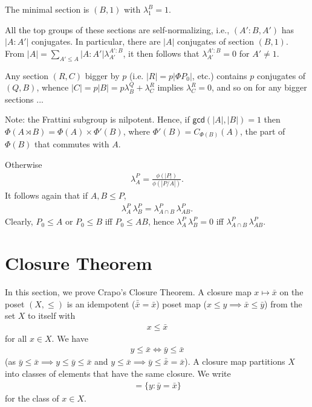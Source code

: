 \documentclass[12pt,a4paper]{amsart}
\newcommand{\Size}[1]{\left|#1\right|}
\renewcommand{\gcd}{\mathsf{gcd}}
\begin{document}
The minimal section is $(B, 1)$
with $\lambda^B_1 = 1$.

All the top groups of these sections are self-normalizing,
i.e., $(A':B, A')$ has $\Size{A:A'}$ conjugates.
In particular, there are $\Size{A}$ conjugates of section $(B, 1)$.
From $\Size{A} = \sum_{A' \leq A} \Size{A:A'} \lambda^{A':B}_{A'}$,
it then follows that $\lambda^{A':B}_{A'} = 0$ for $A' \neq 1$.

Any section $(R, C)$ bigger by $p$ (i.e. $\Size{R} = p \Size{\Phi{P_0}}$, etc.)
contains $p$ conjugates of $(Q, B)$,
whence
$\Size{C} = p \Size{B} = p \lambda^Q_B + \lambda^R_C$
implies $\lambda^R_C = 0$, and so on for any bigger sections ...

Note: the Frattini subgroup is nilpotent. Hence, if $\gcd(\Size{A}, \Size{B}) = 1$ then
$\Phi(A \rtimes B) = \Phi(A) \times \Phi'(B)$,
where $\Phi'(B) = C_{\Phi(B)}(A)$, the part of $\Phi(B)$ that
commutes with $A$.


Otherwise
\begin{align*}
  \lambda^P_A = \frac{\phi(\Size{P})}{\phi(\Size{P/A})}.
\end{align*}
It follows again that
if $A, B \leq P$,
\begin{align*}
  \lambda^P_A\, \lambda^P_B = \lambda^P_{A \cap B}\, \lambda^P_{AB}.
\end{align*}
Clearly, $P_0 \leq A$ or $P_0 \leq B$ iff $P_0 \leq AB$,
hence $\lambda^P_A\, \lambda^P_B = 0$ iff
$\lambda^P_{A \cap B}\, \lambda^P_{AB}$.

\section{Closure Theorem}
\label{sec:closure-theorem}

In this section, we prove Crapo's Closure Theorem.  A closure map
$x \mapsto \bar{x}$
on
the poset $(X, \leq)$ is an idempotent ($\bar{\bar{x}} = \bar{x}$) poset map
($x \leq y \implies \bar{x} \leq \bar{y}$) from the set
$X$ to itself with
\begin{align*}
x \leq \bar{x}
\end{align*}
for all $x \in X$.  We have
\begin{align*}
  y \leq \bar{x} \iff \bar{y} \leq \bar{x}
\end{align*}
(as $\bar{y} \leq \bar{x} \implies y \leq \bar{y} \leq \bar{x}$ and
$y \leq \bar{x} \implies \bar{y} \leq \bar{\bar{x}} = \bar{x}$).
A closure map partitions $X$ into classes of
elements that have the same closure. We write
\begin{align*}
[x] = \{y: \bar{y} = \bar{x}\}
\end{align*}
for the class of $x \in X$.
\end{document}
